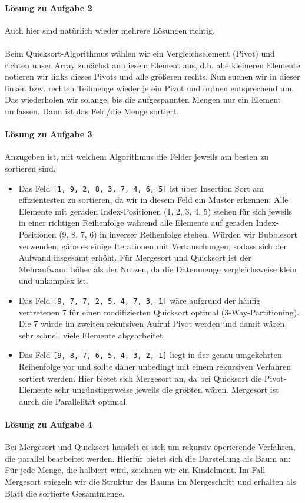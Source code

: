 \documentclass[11pt,a4paper]{scrartcl}
\begin{document}
\paragraph{Lösung zu Aufgabe 2}
\label{a3.2:lsg}
Auch hier sind natürlich wieder mehrere Lösungen richtig. \\\\
Beim Quicksort-Algorithmus wählen wir ein Vergleichselement (Pivot) und richten unser Array zunächst an diesem Element aus, d.h. alle kleineren Elemente notieren wir links dieses Pivots und alle größeren rechts. Nun suchen wir in dieser linken bzw. rechten Teilmenge wieder je ein Pivot und ordnen entsprechend um. Das wiederholen wir solange, bis die aufgespannten Mengen nur ein Element umfassen. Dann ist das Feld/die Menge sortiert.
\paragraph{Lösung zu Aufgabe 3}
\label{a3.3:lsg}
Anzugeben ist, mit welchem Algorithmus die Felder jeweils am besten zu sortieren sind. 
\begin{itemize}
\item Das Feld \texttt{[1, 9, 2, 8, 3, 7, 4, 6, 5]} ist über Insertion Sort am effizientesten zu sortieren, da wir in diesem Feld ein Muster erkennen: Alle Elemente mit geraden Index-Positionen (1, 2, 3, 4, 5) stehen für sich jeweils in einer richtigen Reihenfolge während alle Elemente auf geraden Index-Positionen (9, 8, 7, 6) in inverser Reihenfolge stehen. Würden wir Bubblesort verwenden, gäbe es einige Iterationen mit Vertauschungen, sodass sich der Aufwand insgesamt erhöht. Für Mergesort und Quicksort ist der Mehraufwand höher als der Nutzen, da die Datenmenge vergleichsweise klein und unkomplex ist.
\item Das Feld \texttt{[9, 7, 7, 2, 5, 4, 7, 3, 1]} wäre aufgrund der häufig vertretenen 7 für einen modifizierten Quicksort optimal (3-Way-Partitioning). Die 7 würde im zweiten rekursiven Aufruf Pivot werden und damit wären sehr schnell viele Elemente abgearbeitet.
\item Das Feld \texttt{[9, 8, 7, 6, 5, 4, 3, 2, 1]} liegt in der genau umgekehrten Reihenfolge vor und sollte daher unbedingt mit einem rekursiven Verfahren sortiert werden. Hier bietet sich Mergesort an, da bei Quicksort die Pivot-Elemente sehr ungünstigerweise jeweils die größten wären. Mergesort ist durch die Parallelität optimal.
\end{itemize}
\paragraph{Lösung zu Aufgabe 4}
\label{a3.4:lsg}
Bei Mergesort und Quicksort handelt es sich um rekursiv operierende Verfahren, die parallel bearbeitet werden. Hierfür bietet sich die Darstellung als Baum an: Für jede Menge, die halbiert wird, zeichnen wir ein Kindelment. Im Fall Mergesort spiegeln wir die Struktur des Baums im Mergeschritt und erhalten als Blatt die sortierte Gesamtmenge.
\end{document}
